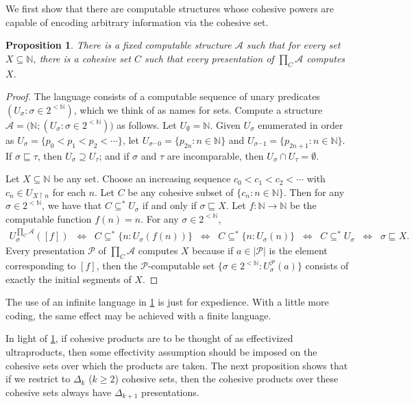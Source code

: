 \documentclass[11pt,a4paper,reqno]{amsart}
\newtheorem{Proposition}[Theorem]{Proposition}
\theoremstyle{definition}
\newcommand{\Biimp}{\Leftrightarrow}
\newcommand{\Nb}{\mathbb{N}}
\newcommand{\smf}{\smallfrown}
\newcommand{\rst}{{\restriction}}
\newcommand{\mc}[1]{\mathcal{#1}}
\begin{document}
We first show that there are computable structures whose cohesive powers are capable of encoding arbitrary information via the cohesive set.

\begin{Proposition}\label{prop-EncodeAll}
There is a fixed computable structure $\mc{A}$ such that for every set $X \subseteq \Nb$, there is a cohesive set $C$ such that every presentation of $\prod_C \mc{A}$ computes $X$.
\end{Proposition}

\begin{proof}
The language consists of a computable sequence of unary predicates $(U_\sigma : \sigma \in 2^{< \Nb})$, which we think of as names for sets.  Compute a structure $\mc{A} = \bigl(\Nb; (U_\sigma : \sigma \in 2^{< \Nb})\bigr)$ as follows.   Let $U_\emptyset = \Nb$.  Given $U_\sigma$ enumerated in order as $U_\sigma = \{p_0 < p_1 < p_2 < \cdots\}$, let $U_{\sigma^\smf 0} = \{p_{2n} : n \in \Nb\}$ and $U_{\sigma^\smf 1} = \{p_{2n+1} : n \in \Nb\}$.  If $\sigma \sqsubseteq \tau$, then $U_\sigma \supseteq U_\tau$; and if $\sigma$ and $\tau$ are incomparable, then $U_\sigma \cap U_\tau  = \emptyset$.

Let $X \subseteq \Nb$ be any set.  Choose an increasing sequence $c_0 < c_1 < c_2 < \cdots$ with $c_n \in U_{X \rst n}$ for each $n$.  Let $C$ be any cohesive subset of $\{c_n : n \in \Nb\}$.  Then for any $\sigma \in 2^{< \Nb}$, we have that $C \subseteq^* U_\sigma$ if and only if $\sigma \sqsubseteq X$.  Let $f \colon \Nb \to \Nb$ be the computable function $f(n) = n$.  For any $\sigma \in 2^{< \Nb}$,
\begin{align*}
U_\sigma^{\prod_C \mc{A}}([f]) \;\;\Biimp\;\; C \subseteq^* \{n : U_\sigma(f(n))\} \;\;\Biimp\;\; C \subseteq^* \{n : U_\sigma(n)\}
\;\;\Biimp\;\; C \subseteq^* U_\sigma \;\;\Biimp\;\; \sigma \sqsubseteq X.
\end{align*}
Every presentation $\mc{P}$ of $\prod_C \mc{A}$ computes $X$ because if $a \in |\mc{P}|$ is the element corresponding to $[f]$, then the $\mc{P}$-computable set $\{\sigma \in 2^{<\Nb} : U_\sigma^\mc{P}(a)\}$ consists of exactly the initial segments of $X$.
\end{proof}

The use of an infinite language in \cref{prop-EncodeAll} is just for expedience.  With a little more coding, the same effect may be achieved with a finite language.

In light of \cref{prop-EncodeAll}, if cohesive products are to be thought of as effectivized ultraproducts, then some effectivity assumption should be imposed on the cohesive sets over which the products are taken.  The next proposition shows that if we restrict to $\Delta_k$ ($k \geq 2$) cohesive sets, then the cohesive products over these cohesive sets always have $\Delta_{k+1}$ presentations.
\end{document}
